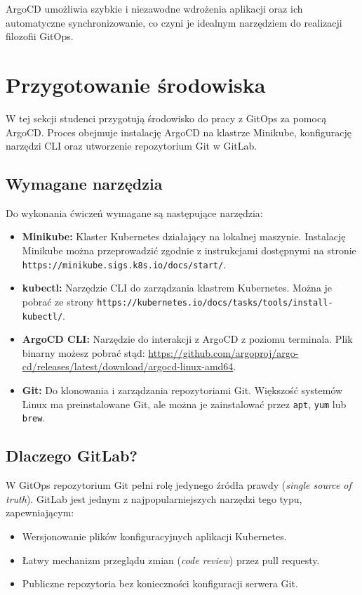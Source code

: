 \documentclass{article}
\begin{document}
ArgoCD umożliwia szybkie i niezawodne wdrożenia aplikacji oraz ich automatyczne synchronizowanie, co czyni je idealnym narzędziem do realizacji filozofii GitOps.



\section{Przygotowanie środowiska}

W tej sekcji studenci przygotują środowisko do pracy z GitOps za pomocą ArgoCD. Proces obejmuje instalację ArgoCD na klastrze Minikube, konfigurację narzędzi CLI oraz utworzenie repozytorium Git w GitLab.

\subsection{Wymagane narzędzia}

Do wykonania ćwiczeń wymagane są następujące narzędzia:
\begin{itemize}
    \item \textbf{Minikube:} Klaster Kubernetes działający na lokalnej maszynie. Instalację Minikube można przeprowadzić zgodnie z instrukcjami dostępnymi na stronie \texttt{https://minikube.sigs.k8s.io/docs/start/}.
    \item \textbf{kubectl:} Narzędzie CLI do zarządzania klastrem Kubernetes. Można je pobrać ze strony \texttt{https://kubernetes.io/docs/tasks/tools/install-kubectl/}.
    \item \textbf{ArgoCD CLI:} Narzędzie do interakcji z ArgoCD z poziomu terminala. Plik binarny możesz pobrać stąd: \url{https://github.com/argoproj/argo-cd/releases/latest/download/argocd-linux-amd64}.
    \item \textbf{Git:} Do klonowania i zarządzania repozytoriami Git. Większość systemów Linux ma preinstalowane Git, ale można je zainstalować przez \texttt{apt}, \texttt{yum} lub \texttt{brew}.
\end{itemize}

\subsection{Dlaczego GitLab?}

W GitOps repozytorium Git pełni rolę jedynego źródła prawdy (\textit{single source of truth}). GitLab jest jednym z najpopularniejszych narzędzi tego typu, zapewniającym:
\begin{itemize}
    \item Wersjonowanie plików konfiguracyjnych aplikacji Kubernetes.
    \item Łatwy mechanizm przeglądu zmian (\textit{code review}) przez pull requesty.
    \item Publiczne repozytoria bez konieczności konfiguracji serwera Git.
\end{itemize}
\end{document}
